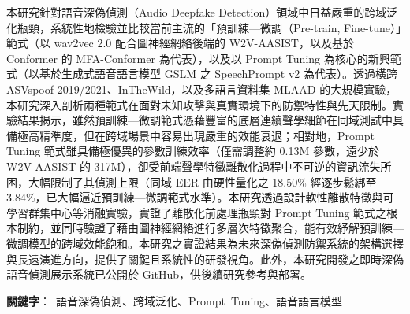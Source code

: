 本研究針對語音深偽偵測（Audio Deepfake Detection）領域中日益嚴重的跨域泛化瓶頸，系統性地檢驗並比較當前主流的「預訓練—微調（Pre-train, Fine-tune）」範式（以 wav2vec 2.0 配合圖神經網絡後端的 W2V-AASIST，以及基於 Conformer 的 MFA-Conformer 為代表），以及以 Prompt Tuning 為核心的新興範式（以基於生成式語音語言模型 GSLM 之 SpeechPrompt v2 為代表）。透過橫跨 ASVspoof 2019/2021、InTheWild，以及多語言資料集 MLAAD 的大規模實驗，本研究深入剖析兩種範式在面對未知攻擊與真實環境下的防禦特性與先天限制。實驗結果揭示，雖然預訓練—微調範式憑藉豐富的底層連續聲學細節在同域測試中具備極高精準度，但在跨域場景中容易出現嚴重的效能衰退；相對地，Prompt Tuning 範式雖具備極優異的參數訓練效率（僅需調整約 0.13M 參數，遠少於 W2V-AASIST 的 317M），卻受前端聲學特徵離散化過程中不可逆的資訊流失所困，大幅限制了其偵測上限（同域 EER 由硬性量化之 18.50\% 經逐步鬆綁至 3.84\%，已大幅逼近預訓練—微調範式水準）。本研究透過設計軟性離散特徵與可學習群集中心等消融實驗，實證了離散化前處理瓶頸對 Prompt Tuning 範式之根本制約，並同時驗證了藉由圖神經網絡進行多層次特徵聚合，能有效紓解預訓練—微調模型的跨域效能飽和。本研究之實證結果為未來深偽偵測防禦系統的架構選擇與長遠演進方向，提供了關鍵且系統性的研發視角。此外，本研究開發之即時深偽語音偵測展示系統已公開於 GitHub，供後續研究參考與部署。

\begin{flushleft}
\mbox{{\bf 關鍵字}： 語音深偽偵測、跨域泛化、Prompt Tuning、語音語言模型}
\end{flushleft}

